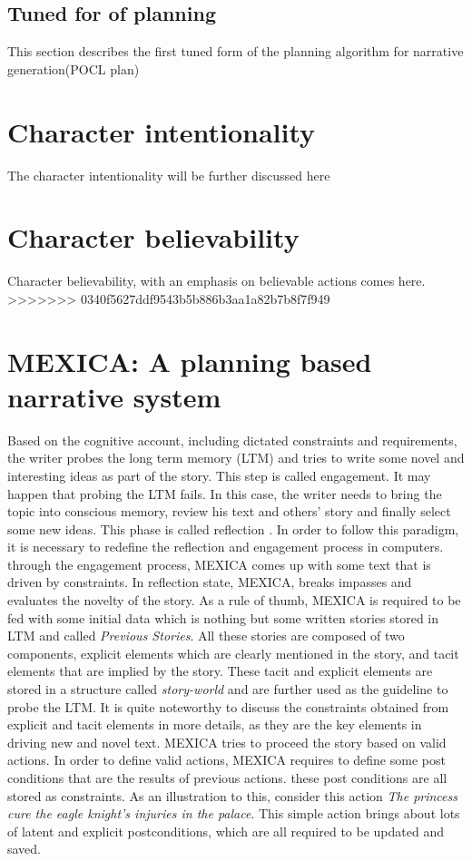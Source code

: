 \documentclass[english]{tktltiki}
\begin{document}
\subsection{Tuned for of planning}
This section describes the first tuned form of the planning algorithm for narrative generation(POCL plan) 
\section{Character intentionality}
The character intentionality will be further discussed here
\section{Character believability}
Character believability, with an emphasis on believable actions comes here.
>>>>>>> 0340f5627ddf9543b5b886b3aa1a82b7b8f7f949
\section{MEXICA: A planning based narrative system}
Based on the cognitive account, including dictated constraints and requirements, the writer probes the long term memory (LTM) and tries to write some novel and interesting ideas as part of the story. This step is called engagement. It may happen that probing the LTM fails. In this case, the writer needs to bring the topic into conscious memory, review his text and others' story and finally select some new ideas. This phase is called reflection \cite{mexica}.
In order to follow this paradigm, it is necessary to redefine the reflection and engagement process in computers. through the engagement process, MEXICA comes up with some text that is driven by constraints. In reflection state, MEXICA, breaks impasses and evaluates the novelty of the story. As a rule of thumb, MEXICA is required to be fed with some initial data which is nothing but some written stories stored in LTM and called \textit{Previous Stories}. All these stories are composed of two components, explicit elements which are clearly mentioned in the story, and tacit elements that are implied by the story. These tacit and explicit elements are stored in a structure called \textit{story-world} and are further used as the guideline to probe the LTM.
It is quite noteworthy to discuss the constraints obtained from explicit and tacit elements in more details, as they are the key elements in driving new and novel text. MEXICA tries to proceed the story based on valid actions. In order to define valid actions, MEXICA requires to define some post conditions that are the results of previous actions. these post conditions are all stored as constraints. As an illustration to this, consider this action \textit{The princess cure the eagle knight's injuries in the palace}. This simple action brings about lots of latent and explicit postconditions, which are all required to be updated and saved.
\end{document}
